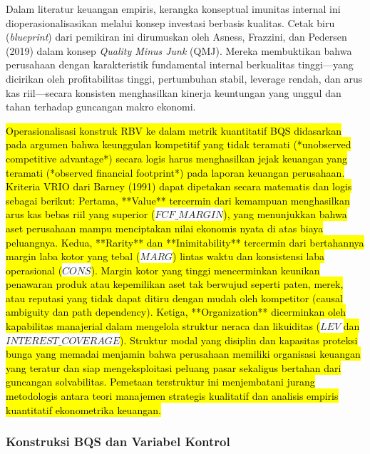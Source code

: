 \documentclass[12pt,a4paper]{article}
\begin{document}
Dalam literatur keuangan empiris, kerangka konseptual imunitas internal
ini dioperasionalisasikan melalui konsep investasi berbasis kualitas.
Cetak biru (\emph{blueprint}) dari pemikiran ini dirumuskan oleh Asness,
Frazzini, dan Pedersen (2019) dalam konsep \emph{Quality Minus Junk}
(QMJ). Mereka membuktikan bahwa perusahaan dengan karakteristik
fundamental internal berkualitas tinggi---yang dicirikan oleh
profitabilitas tinggi, pertumbuhan stabil, leverage rendah, dan arus kas
riil---secara konsisten menghasilkan kinerja keuntungan yang unggul dan
tahan terhadap guncangan makro ekonomi.

\hl{Operasionalisasi konstruk RBV ke dalam metrik kuantitatif BQS didasarkan pada argumen bahwa keunggulan kompetitif yang tidak teramati (*unobserved competitive advantage*) secara logis harus menghasilkan jejak keuangan yang teramati (*observed financial footprint*) pada laporan keuangan perusahaan. Kriteria VRIO dari Barney (1991) dapat dipetakan secara matematis dan logis sebagai berikut: Pertama, **Value** tercermin dari kemampuan menghasilkan arus kas bebas riil yang superior (}$FCF\_MARGIN$\hl{), yang menunjukkan bahwa aset perusahaan mampu menciptakan nilai ekonomis nyata di atas biaya peluangnya. Kedua, **Rarity** dan **Inimitability** tercermin dari bertahannya margin laba kotor yang tebal (}$MARG$\hl{) lintas waktu dan konsistensi laba operasional (}$CONS$\hl{). Margin kotor yang tinggi mencerminkan keunikan penawaran produk atau kepemilikan aset tak berwujud seperti paten, merek, atau reputasi yang tidak dapat ditiru dengan mudah oleh kompetitor (causal ambiguity dan path dependency). Ketiga, **Organization** dicerminkan oleh kapabilitas manajerial dalam mengelola struktur neraca dan likuiditas (}$LEV$\hl{ dan }$INTEREST\_COVERAGE$\hl{). Struktur modal yang disiplin dan kapasitas proteksi bunga yang memadai menjamin bahwa perusahaan memiliki organisasi keuangan yang teratur dan siap mengeksploitasi peluang pasar sekaligus bertahan dari guncangan solvabilitas. Pemetaan terstruktur ini menjembatani jurang metodologis antara teori manajemen strategis kualitatif dan analisis empiris kuantitatif ekonometrika keuangan.}

\subsubsection{Konstruksi BQS dan Variabel
Kontrol}\label{konstruksi-bqs-dan-variabel-kontrol}
\end{document}

